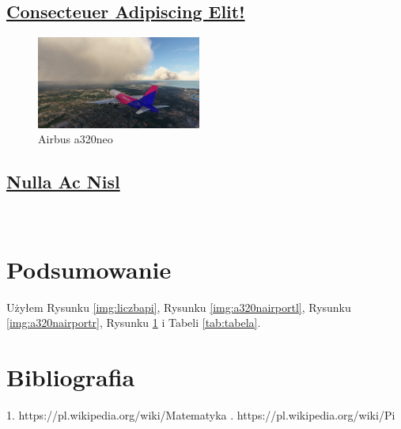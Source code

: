 \documentclass[]{article}
\begin{document}
\newpage
    \subsection{\underline{Consecteuer Adipiscing Elit!}}
    \lipsum[15-19]
   
\begin{figure}
  \centering
  \includegraphics[width=0.48\textwidth]{landing.png}
  \caption{Airbus a320neo}
  \label{img:a320n}
\end{figure}

\newpage
    \subsection{\underline{Nulla Ac Nisl}}
    \lipsum[20-22] \\

\section{Podsumowanie}
Użyłem Rysunku \ref{img:liczbapi}, Rysunku \ref{img:a320nairportl}, Rysunku \ref{img:a320nairportr}, Rysunku \ref{img:a320n} i Tabeli \ref{tab:tabela}.

\section{Bibliografia}
1.  https://pl.wikipedia.org/wiki/Matematyka
.  https://pl.wikipedia.org/wiki/Pi
\end{document}
